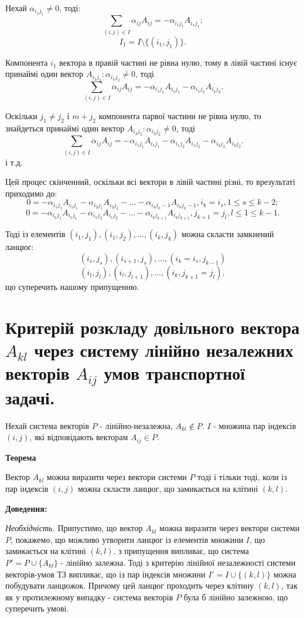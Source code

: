 \documentclass[12pt,a4paper]{article}
\begin{document}
Нехай $\alpha_{{i_1}{j_1}} \neq 0$, тоді: 
$$\sum_{(i,j) \in I}\alpha_{ij}A_{ij} = -\alpha_{{i_1}{j_1}}A_{{i_1}{j_1}};$$
$$I_1 = I\setminus\{(i_1,j_1)\}.$$

Компонента $i_1$ вектора в правій частині не рівна нулю, тому в лівій частині існує принаймі один вектор $A_{{i_1}{j_2}}: \alpha_{{i_1}{j_2}}\neq0$, тоді 
$$\sum_{(i,j){\in}I}\alpha_{ij}A_{ij} = -\alpha_{{i_1}{j_1}}A_{{i_1}{j_1}}-\alpha_{{i_1}{j_2}}A_{{i_1}{j_2}}.$$

Оскільки $j_1 \neq j_2$ і $m + j_2$ компонента парвої частини не рівна нулю, то знайдеться принаймі один вектор $A_{{i_2}{j_2}}: \alpha_{{i_2}{j_2}} \neq 0$, тоді $$\sum_{(i,j) \in I}\alpha_{ij}A_{ij} = -\alpha_{{i_1}{j_1}}A_{{i_1}{j_1}}-\alpha_{{i_1}{j_2}}A_{{i_1}{j_2}}-\alpha_{{i_2}{j_2}}A_{{i_2}{j_2}}.$$
і т.д.

Цей процес скінченний, оскільки всі вектори в лівій частині різні, то врезультаті приходимо до:
$$0 = -\alpha_{{i_1}{j_1}}A_{{i_1}{j_1}}-\alpha_{{i_2}{j_1}}A_{{i_2}{j_1}}-\dots-\alpha_{{i_k}{j_k-1}}A_{{i_k}{j_k-1}}, i_k=i_s, 1 \leq s \leq k-2;$$
$$0 = -\alpha_{{i_1}{j_1}}A_{{i_1}{j_1}}-\alpha_{{i_1}{j_2}}A_{{i_1}{j_2}}-\dots-\alpha_{{i_k}{j_{k+1}}}A_{{i_k}{j_{k+1}}}, j_{k+1}=j_l, l \leq 1 \leq k-1.$$

Тоді із елементів $(i_1,j_1), (i_1,j_2), \dots, (i_k,j_k)$ можна скласти замкнений ланцюг:
$$(i_s,j_s), (i_{s+1},j_s), \dots, (i_k = i_s, j_{k-1})$$
$$(i_l,j_l), (i_l,j_{l+1}), \dots, (i_k, j_{k+1} = j_l),$$
що суперечить нашому припущенню.

\clearpage

\section{Критерій розкладу довільного вектора $A_{kl}$ через систему лінійно незалежних векторів $A_{ij}$ умов транспортної задачі.}

Нехай система векторів $P$ - лінійно-незалежна, $A_{kl} \notin P$. $I$ - множина пар індексів $(i,j)$, які відповідають векторам $A_{ij} \in P$.

{\bf Теорема}

Вектор $A_{kl}$ можна виразити через вектори системи $P$ тоді і тільки тоді, коли із пар індексів $(i,j)$ можна скласти ланцюг, що замикається на клітині $(k,l)$.

{\bf Доведення:}

{\it Необхідність.} Припустимо, що вектор $A_{kl}$ можна виразити через вектори системи $P$, покажемо, що можливо утворити ланцюг із елементів множини $I$, що замикається на клітині $(k,l)$. з припущення випливає, що система $P'=P \cup \{A_{kl}\}$ - лінійно залежна. Тоді з критерію лінійної незалежності системи векторів-умов ТЗ випливає, що із пар індексів множини $I'=I \cup \{(k,l)\}$ можна побудувати ланцюжок. Причому цей ланцюг проходить через клітину $(k,l)$, так як у протилежному випадку - система векторів $P$ була б лінійно залежною, що суперечить умові.
\end{document}
